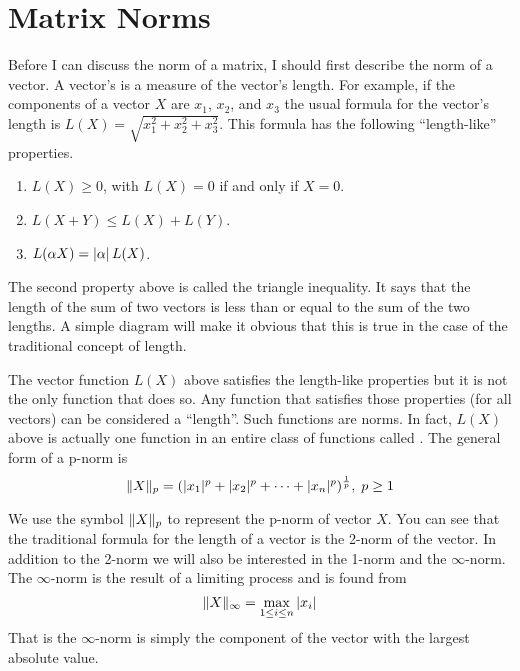 
\section{Matrix Norms}
\label{sec:matrix-norms}

Before I can discuss the norm of a matrix, I should first describe the norm of a vector. A
vector's  is a measure of the vector's length. For example, if the components of a
vector $X$ are $x_1$, $x_2$, and $x_3$ the usual formula for the vector's length is $L(X) =
\sqrt{x_1^2 + x_2^2 + x_3^2}$. This formula has the following ``length-like'' properties.

\begin{enumerate}

\item $L(X) \ge 0$, with $L(X) = 0$ if and only if $X = 0$.

\item $L(X + Y) \le L(X) + L(Y)$.

\item $L(\alpha X) = |\alpha|\, L(X)$.

\end{enumerate}

The second property above is called the triangle inequality. It says that the length of the sum
of two vectors is less than or equal to the sum of the two lengths. A simple diagram will make
it obvious that this is true in the case of the traditional concept of length.

The vector function $L(X)$ above satisfies the length-like properties but it is not the only
function that does so. Any function that satisfies those properties (for all vectors) can be
considered a ``length''. Such functions are norms. In fact, $L(X)$ above is actually one
function in an entire class of functions called . The general form of a p-norm
is
\begin{displaymath}
\|X\|_p = (|x_1|^p + |x_2|^p + \cdots + |x_n|^p)^{\frac{1}{p}},\; p \ge 1
\end{displaymath}

We use the symbol $\|X\|_p$ to represent the p-norm of vector $X$. You can see that the
traditional formula for the length of a vector is the 2-norm of the vector. In addition to the
2-norm we will also be interested in the 1-norm and the $\infty$-norm. The $\infty$-norm is the
result of a limiting process and is found from
\begin{displaymath}
\|X\|_\infty = \max_{1 \le i \le n} |x_i|
\end{displaymath}
That is the $\infty$-norm is simply the component of the vector with the largest absolute value.

